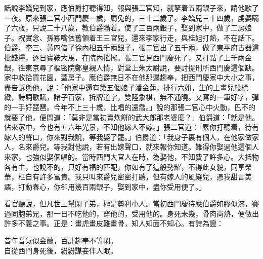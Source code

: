 話說李嬌兒到家，應伯爵打聽得知，報與張二官知，就拏着五兩銀子來，請他歇了一夜。原來張二官小西門慶一歲，屬兔的，三十二歲了。李嬌兒三十四歲，虔婆瞞了六歲，只說二十八歲，教伯爵瞞着。使了三百兩銀子，娶到家中，做了二房娘子。祝實念、孫寡嘴依舊領着王三官兒，還來李家行走，與桂姐打熱，不在話下。{}伯爵、李三、黃四借了徐內相五千兩銀子，張二官出了五千兩，做了東平府古器這批錢糧，逐日寶鞍大馬，在院內搖擺。張二官見西門慶死了，又打點了上千兩金銀，徃東京尋了樞密院鄭皇親人情，對堂上朱太尉說，要討提刑所西門慶這個缺。家中收拾買花園，蓋房子。應伯爵無日不在他那邊趨奉，把西門慶家中大小之事，盡告訴與他，{}說：「他家中還有第五個娘子潘金蓮，排行六姐，生的上畫兒般標緻，詩詞歌賦，諸子百家，拆牌道字，雙陸象棋，無不通曉。又寫的一筆好字，彈的一手好琵琶。今年不上三十歲，比唱的還喬。」說的那張二官心中火動，巴不的就要了他，便問道：「莫非是當初賣炊餅的武大郎那老婆麼？」伯爵道：「就是他。佔來家中，今也有五六年光景，不知他嫁人不嫁。」張二官道：「累你打聽着，待有嫁人的聲口，你來對我說，等我娶了罷。」伯爵道：「我身子裏有個人，在他家做家人，名來爵兒。等我對他說，若有出嫁聲口，就來報你知道。難得你娶過他這個人來家，也強似娶個唱的。當時西門大官人在時，為娶他，不知費了許多心。大抵物各有主，也說不的，只好有福的匹配，你如有了這般勢耀，不得此女貌，同享榮華，枉自有許多富貴。我只叫來爵兒密密打聽，但有嫁人的風縫兒，憑我甜言美語，打動春心，你卻用幾百兩銀子，娶到家中，盡你受用便了。」

看官聽說，但凡世上幫閑子弟，極是勢利小人。當初西門慶待應伯爵如膠似漆，賽過同胞弟兄，那一日不吃他的，穿他的，受用他的。身死未幾，骨肉尚熱，便做出許多不義之事。{}正是：畫虎畫皮難畫骨，知人知面不知心。有詩為證：

\begin{myquote}
昔年音氣似金蘭，百計趨奉不等閑。\\自從西門身死後，紛紛謀妾伴人眠。
\end{myquote}

